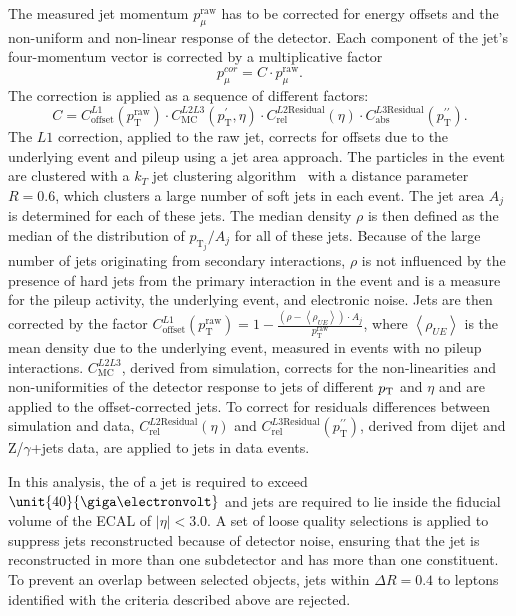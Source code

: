 The measured jet momentum $p_{\mu}^{\text{raw}}$ has to be corrected for energy offsets and the non-uniform and non-linear response of the detector. Each component of the jet's four-momentum vector is corrected by a multiplicative factor~\cite{1748-0221-6-11-P11002}
\begin{equation}
p_{\mu}^{cor} = C \cdot p_{\mu}^{\text{raw}}.
\end{equation} 
The correction is applied as a sequence of different factors: 
\begin{equation}
C = C^{L1}_{\text{offset}}(p_{\mathrm{T}}^{\text{raw}})\cdot C^{L2L3}_{\text{MC}}(p_{\mathrm{T}}^{\prime},\eta)\cdot C^{L2\text{Residual}}_{\text{rel}}(\eta) \cdot C^{L3\text{Residual}}_{\text{abs}}(p_{\mathrm{T}}^{\prime\prime}).
\end{equation}
The $L1$ correction, applied to the raw jet, corrects for offsets due to the underlying event and pileup using a jet area approach. The particles in the event are clustered with a $k_T$ jet clustering algorithm~\cite{Catani:1991hj} with a distance parameter $R=0.6$, which clusters a large number of soft jets in each event. The jet area $A_j$ is determined for each of these jets. The median \pt density $\rho$ is then defined as the median of the distribution of $p_{\mathrm{T}_j}/A_j$ for all of these jets. Because of the large number of jets originating from secondary interactions, $\rho$ is not influenced by the presence of hard jets from the primary interaction in the event and is a measure for the pileup activity, the underlying event, and electronic noise. Jets are then corrected by the factor $C^{L1}_{\text{offset}}(p_\mathrm{T}^{\text{raw}}) = 1-\frac{(\rho-\left<\rho_{UE}\right>)\cdot A_j}{p_\mathrm{T}^{\text{raw}}}$, where $\left<\rho_{UE}\right>$ is the mean \pt density due to the underlying event, measured in events with no pileup interactions. $C^{L2L3}_{\text{MC}}$, derived from simulation, corrects for the non-linearities and non-uniformities of the detector response to jets of different $p_{\mathrm{T}}$ and $\eta$ and are applied to the offset-corrected jets. To correct for residuals differences between simulation and data, $C^{L2\text{Residual}}_{\text{rel}}(\eta)$ and $C^{L3\text{Residual}}_{\text{rel}}(p_{\mathrm{T}}^{\prime\prime})$, derived from dijet and Z/$\gamma$+jets data, are applied to jets in data events. 

In this analysis, the \pt of a jet is required to exceed $\unit{40}{\giga\electronvolt}$ and jets are required to lie inside the fiducial volume of the ECAL of $|\eta| < 3.0$. A set of loose quality selections is applied to suppress jets reconstructed because of detector noise, ensuring that the jet is reconstructed in more than one subdetector and has more than one constituent. To prevent an overlap between selected objects, jets within $\Delta R = 0.4$ to leptons identified with the criteria described above are rejected. 

